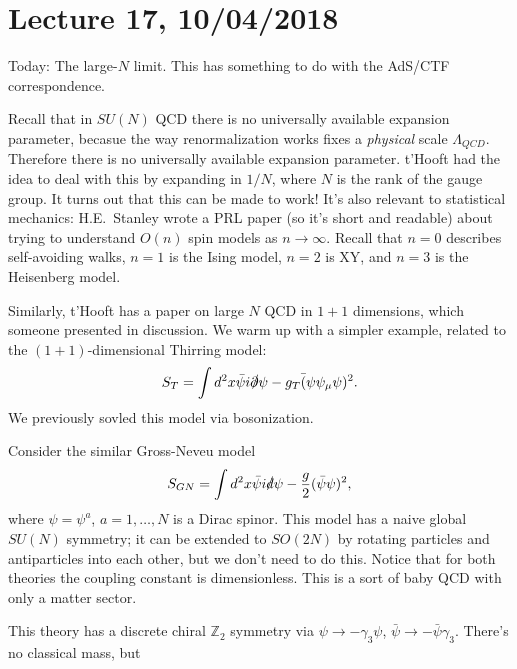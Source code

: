 \section*{Lecture 17, 10/04/2018}
Today: The large-$N$ limit.
This has something to do with the AdS/CTF correspondence.

Recall that in $SU(N)$ QCD there is no universally available expansion parameter, becasue the way renormalization works fixes a \emph{physical} scale $\Lambda_{QCD}$.
Therefore there is no universally available expansion parameter.
t'Hooft had the idea to deal with this by expanding in $1/N$, where $N$ is the rank of the gauge group.
It turns out that this can be made to work!
It's also relevant to statistical mechanics: H.E.~Stanley wrote a PRL paper (so it's short and readable) about trying to understand $O(n)$ spin models as $n \to \infty$.
Recall that $n = 0$ describes self-avoiding walks, $n =1$ is the Ising model, $n = 2$ is XY, and $n = 3$ is the Heisenberg model.

Similarly, t'Hooft has a paper on large $N$ QCD in $1+1$ dimensions, which someone presented in discussion.
We warm up with a simpler example, related to the $(1+1)$-dimensional Thirring model:
\[
S_T = \int d^2x \bar \psi i \slashed \partial \psi - g_T \bar (\psi \psi_\mu \psi)^2. 
\]
We previously sovled this model via bosonization.

Consider the similar Gross-Neveu model
\[
S_{GN} = \int d^2 x \bar \psi i \slashed d \psi - \frac{g}{2} (\bar \psi \psi)^2,
\]
where $\psi = \psi^a$, $a = 1, \dots , N$ is a Dirac spinor.
This model has a naive global $SU(N)$ symmetry; it can be extended to $SO(2N)$ by rotating particles and antiparticles into each other, but we don't need to do this.
Notice that for both theories the coupling constant is dimensionless.
This is a sort of baby QCD with only a matter sector.

This theory has a discrete chiral $\mathbb{Z}_2$ symmetry via $\psi \to - \gamma_3 \psi$, $\bar \psi \to - \bar \psi \gamma_3$.
There's no classical mass, but 

